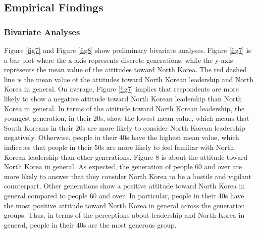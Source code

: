 \documentclass[letterpaper,9pt,twocolumn,twoside,]{pinp}
\begin{document}
\hypertarget{empirical-findings}{%
\subsection{Empirical Findings}\label{empirical-findings}}

\hypertarget{bivariate-analyses}{%
\subsubsection{Bivariate Analyses}\label{bivariate-analyses}}

Figure \ref{fig7} and Figure \ref{fig8} show preliminary bivariate
analyses. Figure \ref{fig7} is a bar plot where the x-axis represents
discrete generations, while the y-axis represents the mean value of the
attitudes toward North Korea. The red dashed line is the mean value of
the attitudes toward North Korean leadership and North Korea in general.
On average, Figure \ref{fig7} implies that respondents are more likely
to show a negative attitude toward North Korean leadership than North
Korea in general. In terms of the attitude toward North Korean
leadership, the youngest generation, in their 20s, show the lowest mean
value, which means that South Koreans in their 20s are more likely to
consider North Korean leadership negatively. Otherwise, people in their
40s have the highest mean value, which indicates that people in their
50s are more likely to feel familiar with North Korean leadership than
other generations. Figure 8 is about the attitude toward North Korea in
general. As expected, the generation of people 60 and over are more
likely to answer that they consider North Korea to be a hostile and
vigilant counterpart. Other generations show a positive attitude toward
North Korea in general compared to people 60 and over. In particular,
people in their 40s have the most positive attitude toward North Korea
in general across the generation groups. Thus, in terms of the
perceptions about leadership and North Korea in general, people in their
40s are the most generous group.
\end{document}
